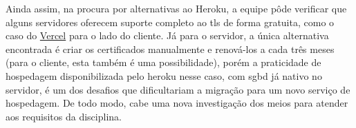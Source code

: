 Ainda assim, na procura por alternativas ao Heroku, a equipe pôde verificar que alguns servidores oferecem suporte completo ao \acs{tls} de forma gratuita, como o caso do \href{https://vercel.com/blog/automatic-ssl-with-vercel-lets-encrypt}{Vercel} para o lado do cliente. Já para o servidor, a única alternativa encontrada é criar os certificados manualmente e renová-los a cada três meses (para o cliente, esta também é uma possibilidade), porém a praticidade de hospedagem disponibilizada pelo \gls{heroku} nesse caso, com \acs{sgbd} já nativo no servidor, é um dos desafios que dificultariam a migração para um novo serviço de hospedagem. De todo modo, cabe uma nova investigação dos meios para atender aos requisitos da disciplina.
